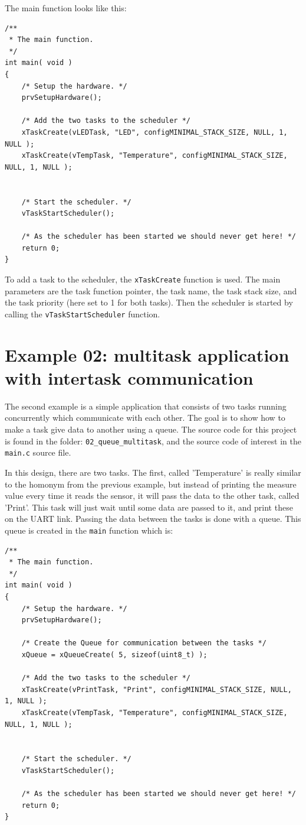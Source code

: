 \documentclass[11pt]{report}
\begin{document}
The main function looks like this:
\begin{verbatim}
/**
 * The main function.
 */
int main( void )
{
    /* Setup the hardware. */
    prvSetupHardware();
    
    /* Add the two tasks to the scheduler */
    xTaskCreate(vLEDTask, "LED", configMINIMAL_STACK_SIZE, NULL, 1, NULL );
    xTaskCreate(vTempTask, "Temperature", configMINIMAL_STACK_SIZE, NULL, 1, NULL );
    
    
    /* Start the scheduler. */
    vTaskStartScheduler();
    
    /* As the scheduler has been started we should never get here! */
    return 0;
}
\end{verbatim}

To add a task to the scheduler, the \verb$xTaskCreate$ function is used. The main parameters are the task function pointer, the task name, the task stack size, and the task priority (here set to 1 for both tasks). Then the scheduler is started by calling the \verb$vTaskStartScheduler$ function.


\section{Example 02: multitask application with intertask communication}

The second example is a simple application that consists of two tasks running concurrently which communicate with each other. The goal is to show how to make a task give data to another using a queue. The source code for this project is found in the folder: \verb$02_queue_multitask$, and the source code of interest in the \verb$main.c$ source file.

In this design, there are two tasks. The first, called 'Temperature' is really similar to the homonym from the previous example, but instead of printing the measure value every time it reads the sensor, it will pass the data to the other task, called 'Print'. This task will just wait until some data are passed to it, and print these on the UART link. Passing the data between the tasks is done with a queue. This queue is created in the \verb$main$ function which is:
\begin{verbatim}
/**
 * The main function.
 */
int main( void )
{
    /* Setup the hardware. */
    prvSetupHardware();
    
    /* Create the Queue for communication between the tasks */
    xQueue = xQueueCreate( 5, sizeof(uint8_t) );
    
    /* Add the two tasks to the scheduler */
    xTaskCreate(vPrintTask, "Print", configMINIMAL_STACK_SIZE, NULL, 1, NULL );
    xTaskCreate(vTempTask, "Temperature", configMINIMAL_STACK_SIZE, NULL, 1, NULL );
    
    
    /* Start the scheduler. */
    vTaskStartScheduler();
    
    /* As the scheduler has been started we should never get here! */
    return 0;
}
\end{verbatim}
\end{document}
